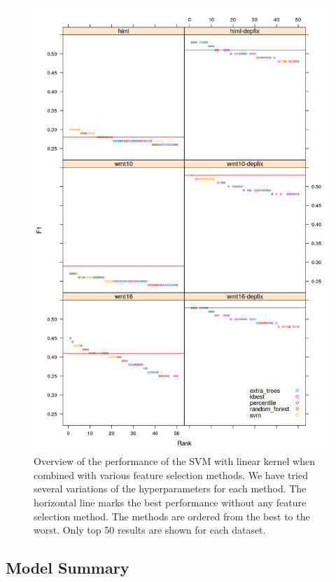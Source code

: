 \begin{figure}
\centering
  \includegraphics[scale=0.7]{wf-sel}
  \caption[Feature selection method comparison - Error detection]{
    Overview of the performance of the SVM with linear kernel when combined with various feature selection methods.
We have tried several variations of the hyperparameters
for each method. The horizontal line marks the best performance without
any feature selection method. The methods are ordered from the best to the worst. Only top 50 results
are shown for each dataset.
}
  \label{wf-sel}
\end{figure}


\subsection{Model Summary}

